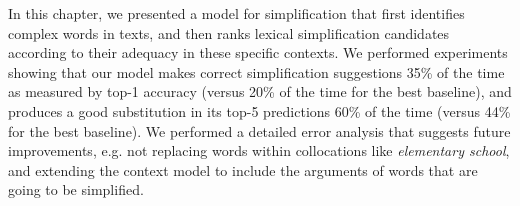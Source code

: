 In this chapter, we presented a model for simplification that first identifies complex words in texts, and then ranks lexical simplification candidates according to their adequacy in these specific contexts. 
We performed experiments showing that our model makes correct simplification suggestions 35\% of the time as measured by top-1 accuracy (versus 20\% of the time for the best baseline), and produces a good substitution in its top-5 predictions 60\% of the time (versus 44\% for the best baseline). We performed a detailed error analysis that suggests future improvements, e.g. not replacing words within collocations like {\it elementary school}, and extending the context model to include the arguments of words that are going to be simplified.